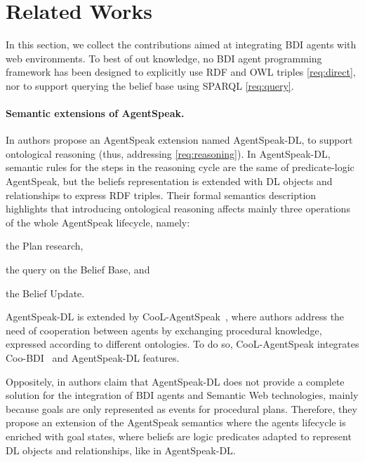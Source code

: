 \documentclass[
]{ceurart}
\begin{document}
\section{Related Works}
\label{sec:related-works}



In this section, 
we collect the contributions aimed at integrating \ac{BDI} agents with web environments.
%
To best of out knowledge,
no \ac{BDI} agent programming framework has been designed to explicitly use \ac{RDF} and \ac{OWL} triples \ref{req:direct},
nor to support querying the belief base using \acs{SPARQL} \ref{req:query}.
%

\paragraph{Semantic extensions of AgentSpeak.}

In \cite{DBLP:conf/dalt/MoreiraVBH05} authors propose an AgentSpeak extension named AgentSpeak-DL, 
to support ontological reasoning (thus, addressing \ref{req:reasoning}).
%
In AgentSpeak-DL, 
semantic rules for the steps in the reasoning cycle are the same of predicate-logic AgentSpeak,
but the beliefs representation is extended with \ac{DL} objects and relationships to express \ac{RDF} triples.
%
Their formal semantics description highlights
that introducing ontological reasoning
affects mainly three operations of the whole AgentSpeak lifecycle, namely:
\begin{inlinelist}
  \item the Plan research, 
  \item the query on the Belief Base, and 
  \item the Belief Update.
\end{inlinelist} 
%
AgentSpeak-DL is extended by CooL-AgentSpeak~\cite{DBLP:journals/wias/MascardiABBR14},
where authors address the need of cooperation between agents by exchanging procedural knowledge, 
expressed according to different ontologies.
%
To do so, 
CooL-AgentSpeak integrates Coo-BDI~\cite{DBLP:conf/dalt/AnconaM03} and AgentSpeak-DL
features.

Oppositely, 
in \cite{DBLP:conf/iat/HalacED11} authors claim that AgentSpeak-DL does not provide a complete solution for the integration of \ac{BDI} agents and Semantic Web technologies,
mainly because goals are only represented as events for procedural plans.
%
Therefore, 
they propose an extension of the AgentSpeak semantics 
where the agents lifecycle is enriched with goal states,
where beliefs are logic predicates adapted to represent \ac{DL} objects and relationships,
like in AgentSpeak-DL.
\end{document}
